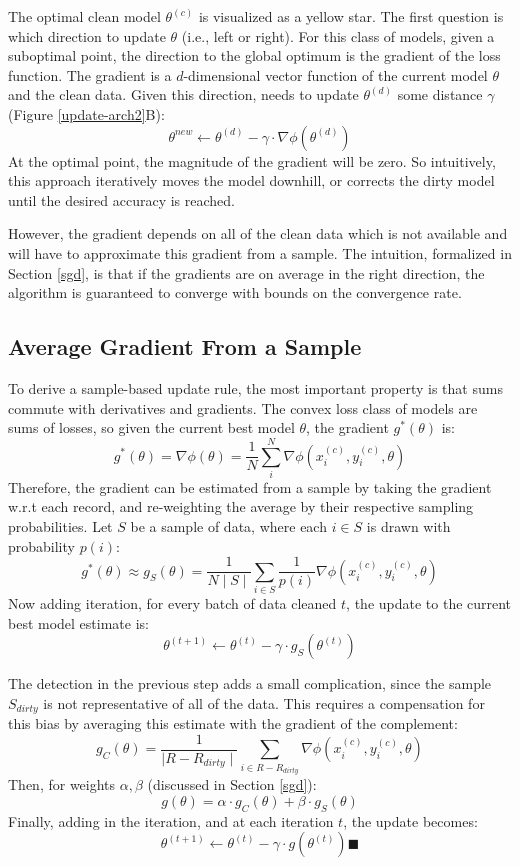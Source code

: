 The optimal clean model $\theta^{(c)}$ is visualized as a yellow star.
The first question is which direction to update $\theta$ (i.e., left or right).
For this class of models, given a suboptimal point, the direction to 
the global optimum is the gradient of the loss function.
The gradient is a $d$-dimensional vector function of the current model $\theta$ and the clean data.
Given this direction, \sys needs to update $\theta^{(d)}$ some distance $\gamma$ (Figure \ref{update-arch2}B):
\[
\theta^{new} \leftarrow \theta^{(d)} - \gamma \cdot \nabla\phi(\theta^{(d)})
\]
At the optimal point, the magnitude of the gradient will be zero.
So intuitively, this approach iteratively moves the model downhill, or corrects the dirty model until the desired accuracy is reached.

However, the gradient depends on all of the clean data which is not available and \sys will have to approximate this gradient from a sample.
The intuition, formalized in Section \ref{sgd}, is that if the gradients are on average in the right direction, the algorithm is guaranteed to converge with bounds on the convergence rate.

\vspace{2em}

\subsection{Average Gradient From a Sample}
To derive a sample-based update rule, the most important property is that sums commute with derivatives and gradients.
The convex loss class of models are sums of losses, so given the current best model $\theta$, the gradient $g^*(\theta)$ is:
\[
g^*(\theta) = \nabla\phi(\theta) = \frac{1}{N} \sum_i^N \nabla\phi(x_i^{(c)},y_i^{(c)},\theta)
\]
Therefore, the gradient can be estimated from a sample by taking the gradient w.r.t each record, and re-weighting the average by their respective sampling probabilities.
Let $S$ be a sample of data, where each $i \in S$ is drawn with probability $p(i)$:
\[
g^*(\theta) \approx g_{S}(\theta) = \frac{1}{N\mid S \mid} \sum_{i \in S}\frac{1}{p(i)}\nabla\phi(x_i^{(c)},y_i^{(c)},\theta)
\]
Now adding iteration, for every batch of data cleaned $t$, the update to the current best model estimate is:
\[
\theta^{(t+1)} \leftarrow \theta^{(t)} - \gamma \cdot g_{S}(\theta^{(t)})
\]

The detection in the previous step adds a small complication, since the sample $S_{dirty}$ is not representative of all of the data.
This requires a compensation for this bias by averaging this estimate with the gradient of the complement:
\[
g_C(\theta) = \frac{1}{\mid R - R_{dirty}\mid}\sum_{i \in R - R_{dirty}}\nabla\phi(x_i^{(c)},y_i^{(c)},\theta)
\]
Then, for weights $\alpha,\beta$ (discussed in Section \ref{sgd}):
\[
g(\theta) = \alpha \cdot g_C(\theta) + \beta \cdot g_S(\theta)
\]
Finally, adding in the iteration, and at each iteration $t$, the update becomes:
\[
\theta^{(t+1)} \leftarrow \theta^{(t)} - \gamma \cdot g(\theta^{(t)}) \blacksquare
\]

